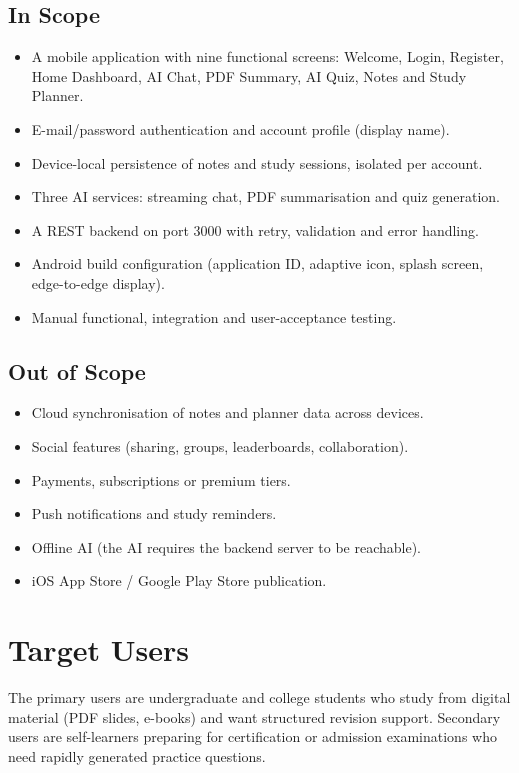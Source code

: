 \documentclass[12pt,a4paper,oneside]{report}
\begin{document}
\subsection{In Scope}
\begin{itemize}[leftmargin=*, itemsep=1pt]
  \item A mobile application with nine functional screens: Welcome, Login, Register,
        Home Dashboard, AI Chat, PDF Summary, AI Quiz, Notes and Study Planner.
  \item E-mail/password authentication and account profile (display name).
  \item Device-local persistence of notes and study sessions, isolated per account.
  \item Three AI services: streaming chat, PDF summarisation and quiz generation.
  \item A REST backend on port 3000 with retry, validation and error handling.
  \item Android build configuration (application ID, adaptive icon, splash screen,
        edge-to-edge display).
  \item Manual functional, integration and user-acceptance testing.
\end{itemize}

\subsection{Out of Scope}
\begin{itemize}[leftmargin=*, itemsep=1pt]
  \item Cloud synchronisation of notes and planner data across devices.
  \item Social features (sharing, groups, leaderboards, collaboration).
  \item Payments, subscriptions or premium tiers.
  \item Push notifications and study reminders.
  \item Offline AI (the AI requires the backend server to be reachable).
  \item iOS App Store / Google Play Store publication.
\end{itemize}

\section{Target Users}
The primary users are undergraduate and college students who study from digital
material (PDF slides, e-books) and want structured revision support. Secondary users
are self-learners preparing for certification or admission examinations who need
rapidly generated practice questions.
\end{document}
